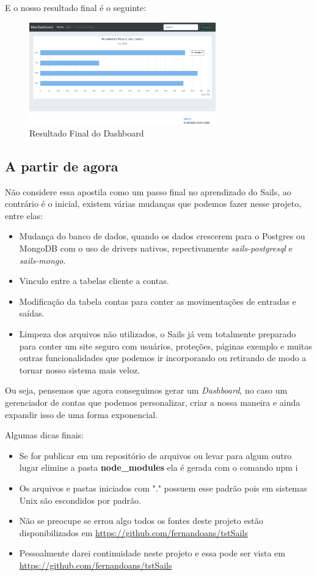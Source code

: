 \documentclass[a4paper,11pt]{article}
\begin{document}
E o nosso resultado final é o seguinte:
\begin{figure}[H]
	\centering
	\includegraphics[width=0.72\textwidth]{imagens/resultadoFinal.png}
	\caption{Resultado Final do Dashboard}
\end{figure}

\subsection{A partir de agora}
Não considere essa apostila como um passo final no aprendizado do Sails, ao contrário é o inicial, existem várias mudanças que podemos fazer nesse projeto, entre elas: \vspace{-1em}
\begin{itemize}
	\item Mudança do banco de dados, quando os dados crescerem para o Postgres ou MongoDB com o uso de drivers nativos, repectivamente \textit{sails-postgresql} e \textit{sails-mongo}.
	\item Vinculo entre a tabelas cliente a contas.
	\item Modificação da tabela contas para conter as movimentações de entradas e saídas.
	\item Limpeza dos arquivos não utilizados, o Sails já vem totalmente preparado para conter um site seguro com usuários, proteções, páginas exemplo e muitas outras funcionalidades que podemos ir incorporando ou retirando de modo a tornar nosso sistema mais veloz.
\end{itemize}

Ou seja, pensemos que agora conseguimos gerar um \textit{Dashboard}, no caso um gerenciador de contas que podemos personalizar, criar a nossa maneira e ainda expandir isso de uma forma exponencial.

Algumas dicas finais: \vspace{-1em}
\begin{itemize}
	\item Se for publicar em um repositório de arquivos ou levar para algum outro lugar elimine a pasta \textbf{node\_modules} ela é gerada com o comando {\ttfamily npm i}
	\item Os arquivos e pastas iniciados com "." possuem esse padrão pois em sistemas Unix são escondidos por padrão.
	\item Não se preocupe se errou algo todos os fontes deste projeto estão disponibilizados em \url{https://github.com/fernandoans/tstSails}
	\item Pessoalmente darei continuidade neste projeto e essa pode ser vista em \url{https://github.com/fernandoans/tstSails}
\end{itemize}
\end{document}
